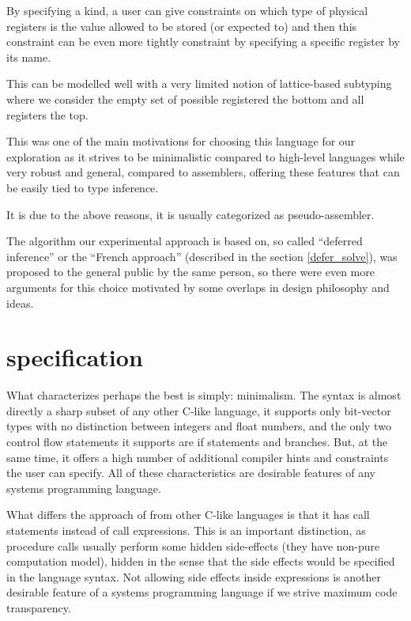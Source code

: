 By specifying a kind, a user can give constraints on which type of physical registers is the value allowed to be stored (or expected to) and then this constraint can be even more tightly constraint by specifying a specific register by its name.

This can be modelled well with a very limited notion of lattice-based subtyping where we consider the empty set of possible registered the bottom and all registers the top.


This was one of the main motivations for choosing this language for our exploration as it strives to be minimalistic compared to high-level languages while very robust and general, compared to assemblers, offering these features that can be easily tied to type inference.

It is due to the above reasons, it is usually categorized as pseudo-assembler.

The algorithm our experimental approach is based on, so called ``deferred inference'' or the ``French approach'' (described in the section \ref{defer_solve}), was proposed to the general public by the same person, so there were even more arguments for this choice motivated by some overlaps in design philosophy and ideas.

\section{\cmm specification}

What characterizes \cmm perhaps the best is simply: minimalism. The syntax is almost directly a sharp subset of any other C-like language, it supports only bit-vector types with no distinction between integers and float numbers, and the only two control flow statements it supports are if statements and branches. But, at the same time, it offers a high number of additional compiler hints and constraints the user can specify. All of these characteristics are desirable features of any systems programming language.

What differs the approach of \cmm from other C-like languages is that it has call statements instead of call expressions. This is an important distinction, as procedure calls usually perform some hidden side-effects (they have non-pure computation model), hidden in the sense that the side effects would be specified in the language syntax. Not allowing side effects inside expressions is another desirable feature of a systems programming language if we strive maximum code transparency.


